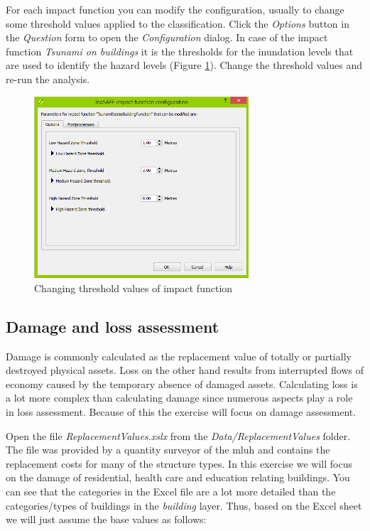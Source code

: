 \documentclass[a4paper,12pt,titlepage]{article}
\begin{document}
For each impact function you can modify the configuration, usually to change some threshold values applied to the classification. Click the \textit{Options} button in the \textit{Question} form to open the \textit{Configuration} dialog. In case of the impact function \textit{Tsunami on buildings} it is the thresholds for the inundation levels that are used to identify the hazard levels (Figure \ref{fig:analysis4}). Change the threshold values and re-run the analysis.

\begin{figure}[htb]
	\centering
	\includegraphics[width=8cm]{Images/analysis4.png}
	\caption{Changing threshold values of impact function}\label{fig:analysis4}
\end{figure}

\subsection{Damage and loss assessment}

Damage is commonly calculated as the replacement value of totally or partially destroyed physical assets. Loss on the other hand results from interrupted flows of economy caused by the temporary absence of damaged assets. Calculating loss is a lot more complex than calculating damage since numerous aspects play a role in loss assessment. Because of this the exercise will focus on damage assessment.

Open the file \textit{ReplacementValues.xslx} from the \textit{Data/ReplacementValues} folder. The file was provided by a quantity surveyor of the \gls{mluh} and contains the replacement costs for many of the structure types. In this exercise we will focus on the damage of residential, health care and education relating buildings. You can see that the categories in the Excel file are a lot more detailed than the categories/types of buildings in the \textit{building} layer. Thus, based on the Excel sheet we will just assume the base values as follows:
\end{document}

